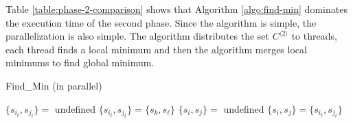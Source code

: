 \documentclass[12pt]{article}
\begin{document}
\begin{table}[ht]
	\center
	\caption{Comparison of execution time of the Algorithm \ref{algo:find-min}($t_{FIND\_MIN}$) and the second phase ($t_{SECOND\_PHASE}$)}
	\label{table:phase-2-comparison}
\end{table}

Table \ref{table:phase-2-comparison} shows that Algorithm \ref{algo:find-min} dominates the execution time of the second phase. Since the algorithm is simple, the parallelization is also simple. The algorithm distributes the set $C^{\langle 2 \rangle}$ to threads, each thread finds a local minimum and then the algorithm merges local minimums to find global minimum.



\begin{algorithm}[ht]
	\caption{Find\_Min (in parallel)}
	\label{algo:find-min-parallel}
	
	{
	$\{ s_{i_t},s_{j_t} \} =$ undefined
	}
	{
		{
			$\{ s_{i_t},s_{j_t} \} = \{ s_k, s_\ell \}$
		}
	}
	$\{ s_i,s_j \} =$ undefined\;
	{
		{
			$\{ s_i,s_j \} = \{ s_{i_t},s_{j_t} \}$
		}
	}
\end{algorithm}
\end{document}
